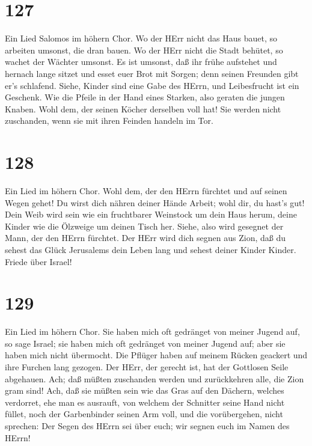 \hypertarget{section-126}{%
\section{127}\label{section-126}}

 Ein Lied Salomos im höhern Chor. Wo der HErr nicht das Haus
bauet, so arbeiten umsonst, die dran bauen. Wo der HErr nicht die Stadt
behütet, so wachet der Wächter umsonst.  Es ist umsonst, daß
ihr frühe aufstehet und hernach lange sitzet und esset euer Brot mit
Sorgen; denn seinen Freunden gibt er's schlafend.  Siehe,
Kinder sind eine Gabe des HErrn, und Leibesfrucht ist ein Geschenk.
 Wie die Pfeile in der Hand eines Starken, also geraten die
jungen Knaben.  Wohl dem, der seinen Köcher derselben voll
hat! Sie werden nicht zuschanden, wenn sie mit ihren Feinden handeln im
Tor.

\hypertarget{section-127}{%
\section{128}\label{section-127}}

 Ein Lied im höhern Chor. Wohl dem, der den HErrn fürchtet
und auf seinen Wegen gehet!  Du wirst dich nähren deiner
Hände Arbeit; wohl dir, du hast's gut!  Dein Weib wird sein
wie ein fruchtbarer Weinstock um dein Haus herum, deine Kinder wie die
Ölzweige um deinen Tisch her.  Siehe, also wird gesegnet der
Mann, der den HErrn fürchtet.  Der HErr wird dich segnen aus
Zion, daß du sehest das Glück Jerusalems dein Leben lang 
und sehest deiner Kinder Kinder. Friede über Israel!

\hypertarget{section-128}{%
\section{129}\label{section-128}}

 Ein Lied im höhern Chor. Sie haben mich oft gedränget von
meiner Jugend auf, so sage Israel;  sie haben mich oft
gedränget von meiner Jugend auf; aber sie haben mich nicht übermocht.
 Die Pflüger haben auf meinem Rücken geackert und ihre
Furchen lang gezogen.  Der HErr, der gerecht ist, hat der
Gottlosen Seile abgehauen.  Ach; daß müßten zuschanden
werden und zurückkehren alle, die Zion gram sind!  Ach, daß
sie müßten sein wie das Gras auf den Dächern, welches verdorret, ehe man
es ausrauft,  von welchem der Schnitter seine Hand nicht
füllet, noch der Garbenbinder seinen Arm voll,  und die
vorübergehen, nicht sprechen: Der Segen des HErrn sei über euch; wir
segnen euch im Namen des HErrn!

